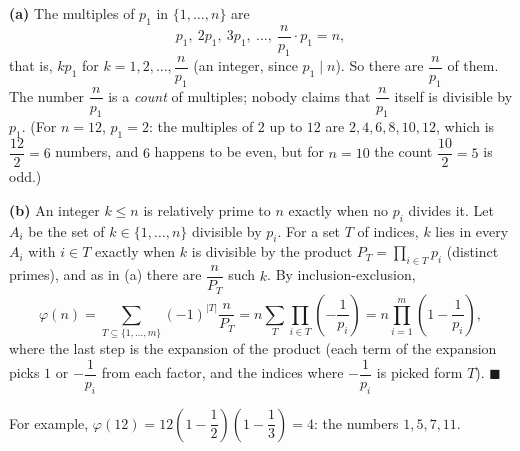 \textbf{(a)} The multiples of $p_1$ in $\{1,\dots,n\}$ are
\[
p_1,\ 2p_1,\ 3p_1,\ \dots,\ \dfrac{n}{p_1}\cdot p_1=n ,
\]
that is, $kp_1$ for $k=1,2,\dots,\dfrac{n}{p_1}$ (an integer, since $p_1\mid n$). So there are $\dfrac{n}{p_1}$ of them. The number $\dfrac{n}{p_1}$ is a \emph{count} of multiples; nobody claims that $\dfrac{n}{p_1}$ itself is divisible by $p_1$. (For $n=12$, $p_1=2$: the multiples of $2$ up to $12$ are $2,4,6,8,10,12$, which is $\dfrac{12}{2}=6$ numbers, and $6$ happens to be even, but for $n=10$ the count $\dfrac{10}{2}=5$ is odd.)

\textbf{(b)} An integer $k\le n$ is relatively prime to $n$ exactly when no $p_i$ divides it. Let $A_i$ be the set of $k\in\{1,\dots,n\}$ divisible by $p_i$. For a set $T$ of indices, $k$ lies in every $A_i$ with $i\in T$ exactly when $k$ is divisible by the product $P_T=\prod_{i\in T}p_i$ (distinct primes), and as in (a) there are $\dfrac{n}{P_T}$ such $k$. By inclusion-exclusion,
\[
\varphi(n)=\sum_{T\subseteq\{1,\dots,m\}}(-1)^{|T|}\dfrac{n}{P_T}
=n\sum_{T}\prod_{i\in T}\left(-\dfrac{1}{p_i}\right)
=n\prod_{i=1}^{m}\left(1-\dfrac{1}{p_i}\right),
\]
where the last step is the expansion of the product (each term of the expansion picks $1$ or $-\dfrac{1}{p_i}$ from each factor, and the indices where $-\dfrac{1}{p_i}$ is picked form $T$). $\blacksquare$

For example, $\varphi(12)=12\left(1-\dfrac{1}{2}\right)\left(1-\dfrac{1}{3}\right)=4$: the numbers $1,5,7,11$.
